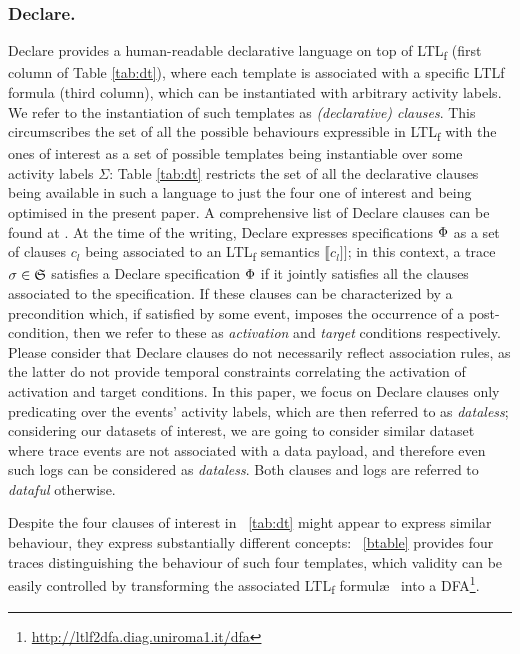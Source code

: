 \documentclass[sigconf]{acmart}
\newcommand{\rrbraket}{\ensuremath{]\!]}}
\begin{document}
\subsubsection{Declare.} Declare \cite{4384001} provides a human-readable declarative language on top of LTL\textsubscript{f} (first column  of Table \ref{tab:dt}), where each template is associated with a specific LTL\textsf{f} formula (third column), which can be instantiated with arbitrary activity labels. We refer to the instantiation of such templates as \textit{(declarative) clauses}. This circumscribes the set of all the possible behaviours expressible in LTL\textsubscript{f} with the ones of interest as a set of possible templates being instantiable over some activity labels $\Sigma$: Table \ref{tab:dt} restricts the set of all the declarative clauses being available in such a language to just the four one of interest and being optimised in the present paper.  A comprehensive list of Declare clauses can be found at \cite{Li2020}. At the time of the writing, Declare expresses specifications $\Phi$ as a set of clauses $c_l$ being associated to an LTL\textsubscript{f} semantics $\llbracket c_l\rrbraket$; in this context, a trace $\sigma\in\mathfrak{S}$ satisfies a Declare specification $\Phi$ if it jointly satisfies all the clauses associated to the specification. If these clauses can be characterized by a precondition which, if satisfied by some event, imposes the occurrence of a post-condition, then we refer to these as \textit{activation} and \textit{target} conditions respectively. Please consider that Declare clauses do not necessarily reflect association rules, as the latter do not provide temporal constraints correlating the activation of activation and target conditions. In this paper, we focus on Declare clauses only predicating over the events' activity labels, which are then referred to as \textit{dataless}; considering our datasets of interest, we are going to consider similar dataset where trace events are not associated with a data payload, and therefore even such logs can be considered as \textit{dataless}. Both clauses and logs are referred to \textit{dataful} otherwise. 

Despite the four clauses of interest in \tablename~\ref{tab:dt} might appear to express similar behaviour, they express substantially different concepts: \tablename~\ref{btable} provides four traces distinguishing the behaviour of such four templates, which validity can be easily controlled by transforming the associated LTL\textsubscript{f} formul\ae~ into a DFA\footnote{\url{http://ltlf2dfa.diag.uniroma1.it/dfa}}.
\end{document}
